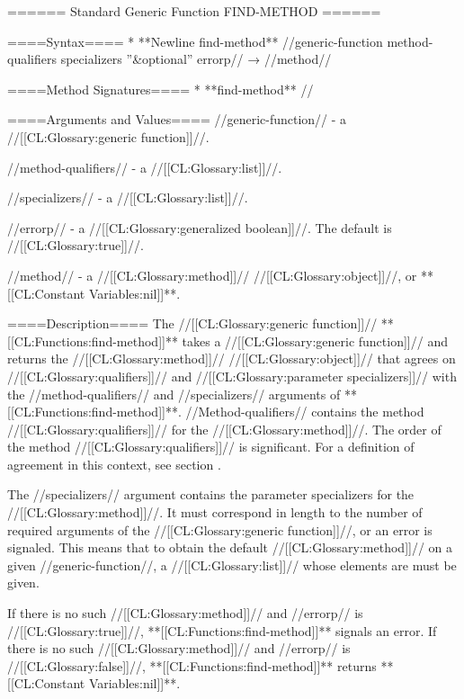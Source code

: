 ====== Standard Generic Function FIND-METHOD ======

====Syntax====
  * **Newline find-method** //generic-function method-qualifiers specializers ''&optional'' errorp// → //method//

====Method Signatures====
  * **find-method** //

====Arguments and Values====
//generic-function// - a //[[CL:Glossary:generic function]]//.

//method-qualifiers// - a //[[CL:Glossary:list]]//.

//specializers// - a //[[CL:Glossary:list]]//.

//errorp// - a //[[CL:Glossary:generalized boolean]]//. The default is //[[CL:Glossary:true]]//.

//method// - a //[[CL:Glossary:method]]// //[[CL:Glossary:object]]//, or **[[CL:Constant Variables:nil]]**.

====Description====
The //[[CL:Glossary:generic function]]// **[[CL:Functions:find-method]]** takes a //[[CL:Glossary:generic function]]// and returns the //[[CL:Glossary:method]]// //[[CL:Glossary:object]]// that agrees on //[[CL:Glossary:qualifiers]]// and //[[CL:Glossary:parameter specializers]]// with the //method-qualifiers// and //specializers// arguments of **[[CL:Functions:find-method]]**. //Method-qualifiers// contains the method //[[CL:Glossary:qualifiers]]// for the //[[CL:Glossary:method]]//. The order of the method //[[CL:Glossary:qualifiers]]// is significant. For a definition of agreement in this context, see section {\secref\SpecializerQualifierAgreement}.

The //specializers// argument contains the parameter specializers for the //[[CL:Glossary:method]]//. It must correspond in length to the number of required arguments of the //[[CL:Glossary:generic function]]//, or an error is signaled. This means that to obtain the default //[[CL:Glossary:method]]// on a given //generic-function//, a //[[CL:Glossary:list]]// whose elements are  must be given.

If there is no such //[[CL:Glossary:method]]// and //errorp// is //[[CL:Glossary:true]]//, **[[CL:Functions:find-method]]** signals an error. If there is no such //[[CL:Glossary:method]]// and //errorp// is //[[CL:Glossary:false]]//, **[[CL:Functions:find-method]]** returns **[[CL:Constant Variables:nil]]**.

